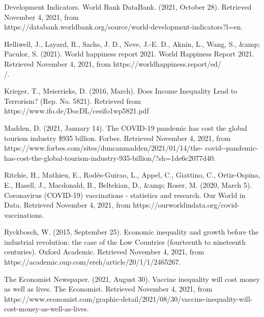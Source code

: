 \documentclass[fontsize=11pt]{article}
\begin{document}
    \item Development Indicators. World Bank DataBank. (2021, October 28). Retrieved November 4, 2021, from \\ \indent https://databank.worldbank.org/source/world-development-indicators?l=en. \\

    \item Helliwell, J., Layard, R., Sachs, J. D., Neve, J.-E. D., Aknin, L., Wang, S., &amp; Paculor, S. (2021). World happiness \indent report 2021. World Happiness Report 2021. Retrieved November 4, 2021, from https://worldhappiness.report/ed/\\ /.\\

    \item Krieger, T.,  Meierrieks, D. (2016, March).  Does Income Inequality Lead to Terrorism?  (Rep.  No.  5821). Retrieved \indent from https://www.ifo.de/DocDL/cesifo1wp5821.pdf \\

    \item Madden, D. (2021, January 14). The COVID-19 pandemic has cost the global tourism industry \$935 billion. \indent Forbes. Retrieved November 4, 2021, from https://www.forbes.com/sites/duncanmadden/2021/01/14/the- covid--pandemic-has-cost-the-global-tourism-industry-935-billion/?sh=1de6c2077d40. \\

    \item Ritchie, H., Mathieu, E., Rodés-Guirao, L., Appel, C., Giattino, C., Ortiz-Ospina, E., Hasell, J., Macdonald, B., \indent Beltekian, D., &amp; Roser, M. (2020, March 5). Coronavirus (COVID-19) vaccinations - statistics and research. \indent Our World in Data. Retrieved November 4, 2021, from https://ourworldindata.org/covid-vaccinations. \\

    \item Ryckbosch, W. (2015, September 25). Economic inequality and growth before the industrial revolution: the case \indent of the Low Countries (fourteenth to nineteenth centuries). Oxford Academic. Retrieved November 4, 2021, from \indent https://academic.oup.com/ereh/article/20/1/1/2465267. \\

    \item The Economist Newspaper. (2021, August 30). Vaccine inequality will cost money as well as lives. The Economist. \indent Retrieved November 4, 2021, from https://www.economist.com/graphic-detail/2021/08/30/vaccine-inequality-\indent will-cost-money-as-well-as-lives. \\
\end{document}
